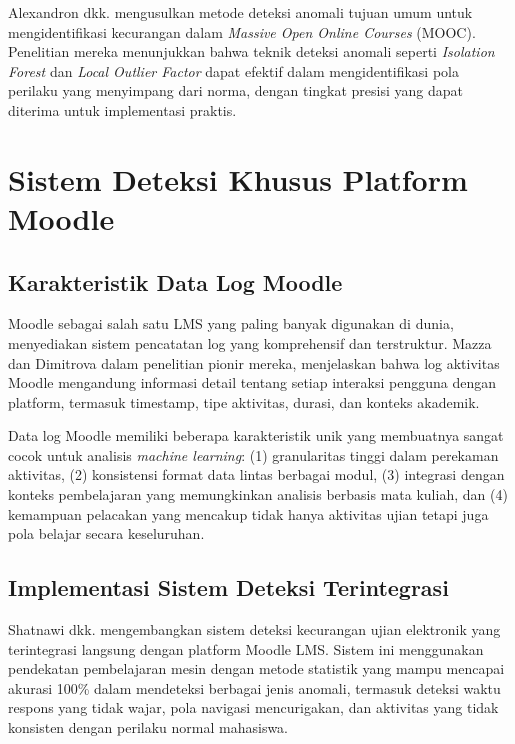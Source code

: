 Alexandron dkk. \cite{Alexandron2019} mengusulkan metode deteksi anomali tujuan umum untuk mengidentifikasi kecurangan dalam \textit{Massive Open Online Courses} (MOOC). Penelitian mereka menunjukkan bahwa teknik deteksi anomali seperti \textit{Isolation Forest} dan \textit{Local Outlier Factor} dapat efektif dalam mengidentifikasi pola perilaku yang menyimpang dari norma, dengan tingkat presisi yang dapat diterima untuk implementasi praktis.

\section{Sistem Deteksi Khusus Platform Moodle}
\label{sec:moodleSpecific}

\subsection{Karakteristik Data Log Moodle}

Moodle sebagai salah satu LMS yang paling banyak digunakan di dunia, menyediakan sistem pencatatan log yang komprehensif dan terstruktur. Mazza dan Dimitrova \cite{article:moodle_logs} dalam penelitian pionir mereka, menjelaskan bahwa log aktivitas Moodle mengandung informasi detail tentang setiap interaksi pengguna dengan platform, termasuk timestamp, tipe aktivitas, durasi, dan konteks akademik.

Data log Moodle memiliki beberapa karakteristik unik yang membuatnya sangat cocok untuk analisis \textit{machine learning}: (1) granularitas tinggi dalam perekaman aktivitas, (2) konsistensi format data lintas berbagai modul, (3) integrasi dengan konteks pembelajaran yang memungkinkan analisis berbasis mata kuliah, dan (4) kemampuan pelacakan yang mencakup tidak hanya aktivitas ujian tetapi juga pola belajar secara keseluruhan.

\subsection{Implementasi Sistem Deteksi Terintegrasi}

Shatnawi dkk. \cite{Shatnawi2024} mengembangkan sistem deteksi kecurangan ujian elektronik yang terintegrasi langsung dengan platform Moodle LMS. Sistem ini menggunakan pendekatan pembelajaran mesin dengan metode statistik yang mampu mencapai akurasi 100\% dalam mendeteksi berbagai jenis anomali, termasuk deteksi waktu respons yang tidak wajar, pola navigasi mencurigakan, dan aktivitas yang tidak konsisten dengan perilaku normal mahasiswa.

